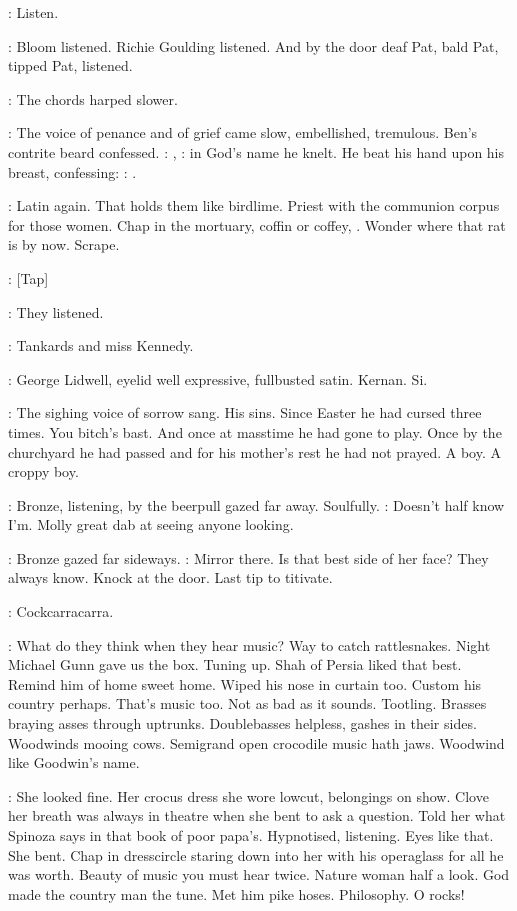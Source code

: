 \BloomInt:
Listen.

:
Bloom listened.
Richie Goulding listened.
And by the door
deaf Pat,
bald Pat,
tipped Pat,
listened.

:
The chords harped slower.

:
The voice of penance and of grief came slow,
embellished,
tremulous.
Ben's contrite beard confessed.
\dollard:
,
:
in God's name he knelt.
He beat his hand upon his breast,
confessing:
\dollard:
.

\BloomInt:
Latin again.
That holds them like birdlime.
Priest with the
communion corpus for those women.
Chap in the mortuary,
coffin or
coffey,
.
Wonder where that rat is by now.
Scrape.

\stripling:
[Tap]

:
They listened.

:
Tankards and miss Kennedy.

:
George Lidwell,
eyelid
well expressive,
fullbusted satin.
Kernan.
Si.

:
The sighing voice of sorrow sang.
His sins.
Since Easter he had
cursed three times.
You bitch's bast.
And once at masstime he had gone to
play.
Once by the churchyard he had passed and for his mother's rest he
had not prayed.
A boy.
A croppy boy.

:
Bronze,
listening,
by the beerpull gazed far away.
Soulfully.
\BloomInt:
Doesn't half know I'm.
Molly great dab at seeing anyone looking.

:
Bronze gazed far sideways.
\BloomInt:
Mirror there.
Is that best side of her face?
They always know.
Knock at the door.
Last tip to titivate.

\BloomInt:
Cockcarracarra.

\BloomInt:
What do they think when they hear music?
Way to catch rattlesnakes.
Night Michael Gunn gave us the box.
Tuning up.
Shah of Persia liked that
best.
Remind him of home sweet home.
Wiped his nose in curtain too.
Custom his country perhaps.
That's music too.
Not as bad as it sounds.
Tootling.
Brasses braying asses through uptrunks.
Doublebasses helpless,
gashes in their sides.
Woodwinds mooing cows.
Semigrand open crocodile
music hath jaws.
Woodwind like Goodwin's name.

\BloomInt:
She looked fine.
Her crocus dress she wore lowcut,
belongings on
show.
Clove her breath was always in theatre when she bent to ask a
question.
Told her what Spinoza says in that book of poor papa's.
Hypnotised,
listening.
Eyes like that.
She bent.
Chap in dresscircle
staring down into her with his operaglass for all he was worth.
Beauty of music you must hear twice.
Nature woman half a look.
God made the
country man the tune.
Met him pike hoses.
Philosophy.
O rocks!

